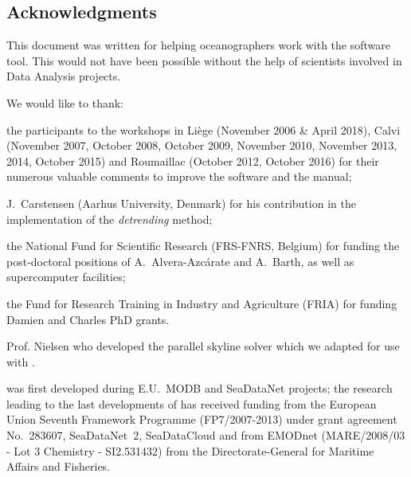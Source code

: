 
\subsection*{Acknowledgments}

This document was written for helping oceanographers work with the \diva software tool. This would not have been possible without the help of scientists involved in Data Analysis projects.

We would like to thank:

the participants to the \diva workshops in Li\`{e}ge (November 2006 \& April 2018), Calvi (November 2007, October 2008, October 2009, November 2010, November 2013, 2014, October 2015) and Roumaillac (October 2012, October 2016) for their numerous valuable comments to improve the software and the manual;

J.~Carstensen (Aarhus University, Denmark) for his contribution in the implementation of the \textit{detrending} method;

the National Fund for Scientific Research (FRS-FNRS, Belgium) for funding the post-doctoral positions of A.~Alvera-Azc\'{a}rate and A.~Barth, as well as supercomputer facilities;

the Fund for Research Training in Industry and Agriculture (FRIA) for funding Damien and Charles PhD grants.

Prof. Nielsen who developed the parallel skyline solver which we adapted for use with \diva \citep{NIELSEN12}.

\diva was first developed during E.U.~MODB and SeaDataNet projects; the research leading to the last developments of \diva has received funding from the European Union Seventh Framework Programme (FP7/2007-2013) under grant agreement No.~283607, SeaDataNet~2, SeaDataCloud and from EMODnet (MARE/2008/03 - Lot 3 Chemistry - SI2.531432) from the Directorate-General for Maritime Affairs and Fisheries. 


\newpage
